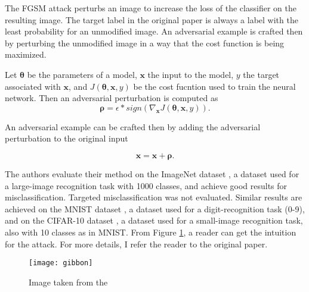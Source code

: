 The FGSM attack perturbs an image to increase the loss of the classifier on the resulting image. The target label in the original paper \cite{fgsm-original} is always a label with the least probability for an unmodified image. An adversarial example is crafted then by perturbing the unmodified image in a way that the cost function is being maximized.

Let $\pmb \theta$ be the parameters of a model, $\pmb x$ the input to the model, $y$ the target associated with $\pmb x$, and $J (\pmb \theta, \pmb x, y)$ be the cost fucntion used to train the neural network. Then an adversarial perturbation is computed as 
\[ 
\pmb \rho = \epsilon * sign (\nabla_{\pmb x} J(\pmb \theta, \pmb x, y)).
\]

An adversarial example can be crafted then by adding the adversarial perturbation to the original input

\[\pmb x = \pmb x + \pmb \rho .\]
 
The authors evaluate their method on the ImageNet dataset \cite{datasetImageNet}, a dataset used for a large-image recognition task with 1000 classes, and achieve good results for misclassification. Targeted misclassification was not evaluated. Similar results are achieved on the MNIST dataset \cite{datasetMNIST}, a dataset used for a digit-recognition task (0-9), and on the CIFAR-10 dataset \cite{datasetCIFAR10}, a dataset used for a small-image recognition task, also with 10 classes as in MNIST. From Figure \ref{fig:gibbon}, a reader can get the intuition for the attack. For more details, I refer the reader to the original paper.

\begin{figure}[h]
\texttt{[image: gibbon]}
\caption{Image taken from the \cite{fgsm-original}}
\label{fig:gibbon}
\end{figure}

